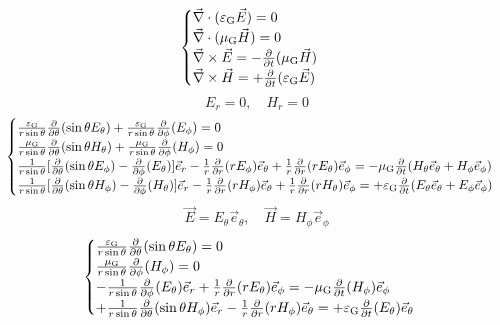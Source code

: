 \begin{equation}
    \begin{cases}
        \vec{\nabla}\cdot(\varepsilon_{\text{G}}\vec{E})=0\\
        \vec{\nabla}\cdot(\mu_{\text{G}}\vec{H})=0\\
        \vec{\nabla}\times\vec{E}=-\frac{\partial}{\partial t}(\mu_{\text{G}}\vec{H})\\
        \vec{\nabla}\times\vec{H}=+\frac{\partial}{\partial t}(\varepsilon_{\text{G}}\vec{E})
    \end{cases}
\end{equation}
\begin{equation}
    {E}_r=0,\quad{H}_r=0
\end{equation}
\begin{equation}
    \begin{cases}
        \frac{\varepsilon_{\text{G}}}{r\sin\theta}\frac{\partial}{\partial\theta}(\sin\theta{E}_\theta)+\frac{\varepsilon_{\text{G}}}{r\sin\theta}\frac{\partial}{\partial\phi}({E}_\phi)=0\\
        \frac{\mu_{\text{G}}}{r\sin\theta}\frac{\partial}{\partial\theta}(\sin\theta{H}_\theta)+\frac{\mu_{\text{G}}}{r\sin\theta}\frac{\partial}{\partial\phi}({H}_\phi)=0\\
        \frac{1}{r\sin\theta}[\frac{\partial}{\partial\theta}(\sin\theta{E}_\phi)-\frac{\partial}{\partial\phi}({E}_\theta)]\vec{e}_r-\frac{1}{r}\frac{\partial}{\partial r}(r{E}_\phi)\vec{e}_\theta+\frac{1}{r}\frac{\partial}{\partial r}(r{E}_\theta)\vec{e}_\phi=-\mu_{\text{G}}\frac{\partial}{\partial t}({H}_\theta\vec{e}_\theta+{H}_\phi\vec{e}_\phi)\\
        \frac{1}{r\sin\theta}[\frac{\partial}{\partial\theta}(\sin\theta{H}_\phi)-\frac{\partial}{\partial\phi}({H}_\theta)]\vec{e}_r-\frac{1}{r}\frac{\partial}{\partial r}(r{H}_\phi)\vec{e}_\theta+\frac{1}{r}\frac{\partial}{\partial r}(r{H}_\theta)\vec{e}_\phi=+\varepsilon_{\text{G}}\frac{\partial}{\partial t}({E}_\theta\vec{e}_\theta+{E}_\phi\vec{e}_\phi)
    \end{cases}
\end{equation}
\begin{equation}
    \vec{E}={E}_\theta\vec{e}_\theta,\quad\vec{H}={H}_\phi\vec{e}_\phi
\end{equation}
\begin{equation}
    \begin{cases}
        \frac{\varepsilon_{\text{G}}}{r\sin\theta}\frac{\partial}{\partial\theta}(\sin\theta E_\theta)=0\\
        \frac{\mu_{\text{G}}}{r\sin\theta}\frac{\partial}{\partial\phi}({H}_\phi)=0\\
        -\frac{1}{r\sin\theta}\frac{\partial}{\partial\phi}({E}_\theta)\vec{e}_r+\frac{1}{r}\frac{\partial}{\partial r}(r{E}_\theta)\vec{e}_\phi=-\mu_{\text{G}}\frac{\partial}{\partial t}({H}_\phi)\vec{e}_\phi\\
        +\frac{1}{r\sin\theta}\frac{\partial}{\partial\theta}(\sin\theta{H}_\phi)\vec{e}_r-\frac{1}{r}\frac{\partial}{\partial r}(r{H}_\phi)\vec{e}_\theta=+\varepsilon_{\text{G}}\frac{\partial}{\partial t}({E}_\theta)\vec{e}_\theta\\
    \end{cases}
\end{equation}
